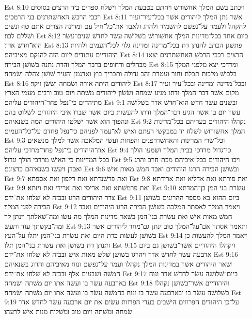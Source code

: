 Est 8:10  ויכתב בשׁם המלך אחשׁורשׁ ויחתם בטבעת המלך וישׁלח ספרים ביד הרצים בסוסים רכבי הרכשׁ האחשׁתרנים בני הרמכים׃
Est 8:11  אשׁר נתן המלך ליהודים אשׁר בכל־עיר־ועיר להקהל ולעמד על־נפשׁם להשׁמיד ולהרג ולאבד את־כל־חיל עם ומדינה הצרים אתם טף ונשׁים ושׁללם לבוז׃
Est 8:12  ביום אחד בכל־מדינות המלך אחשׁורושׁ בשׁלושׁה עשׂר לחדשׁ שׁנים־עשׂר הוא־חדשׁ אדר׃
Est 8:13  פתשׁגן הכתב להנתן דת בכל־מדינה ומדינה גלוי לכל־העמים ולהיות היהודיים עתודים ליום הזה להנקם מאיביהם׃
Est 8:14  הרצים רכבי הרכשׁ האחשׁתרנים יצאו מבהלים ודחופים בדבר המלך והדת נתנה בשׁושׁן הבירה׃
Est 8:15  ומרדכי יצא מלפני המלך בלבושׁ מלכות תכלת וחור ועטרת זהב גדולה ותכריך בוץ וארגמן והעיר שׁושׁן צהלה ושׂמחה׃
Est 8:16  ליהודים היתה אורה ושׂמחה ושׂשׂן ויקר׃
Est 8:17  ובכל־מדינה ומדינה ובכל־עיר ועיר מקום אשׁר דבר־המלך ודתו מגיע שׂמחה ושׂשׂון ליהודים משׁתה ויום טוב ורבים מעמי הארץ מתיהדים כי־נפל פחד־היהודים עליהם׃
Est 9:1  ובשׁנים עשׂר חדשׁ הוא־חדשׁ אדר בשׁלושׁה עשׂר יום בו אשׁר הגיע דבר־המלך ודתו להעשׂות ביום אשׁר שׂברו איבי היהודים לשׁלוט בהם ונהפוך הוא אשׁר ישׁלטו היהודים המה בשׂנאיהם׃
Est 9:2  נקהלו היהודים בעריהם בכל־מדינות המלך אחשׁורושׁ לשׁלח יד במבקשׁי רעתם ואישׁ לא־עמד לפניהם כי־נפל פחדם על־כל־העמים׃
Est 9:3  וכל־שׂרי המדינות והאחשׁדרפנים והפחות ועשׂי המלאכה אשׁר למלך מנשׂאים את־היהודים כי־נפל פחד־מרדכי עליהם׃
Est 9:4  כי־גדול מרדכי בבית המלך ושׁמעו הולך בכל־המדינות כי־האישׁ מרדכי הולך וגדול׃
Est 9:5  ויכו היהודים בכל־איביהם מכת־חרב והרג ואבדן ויעשׂו בשׂנאיהם כרצונם׃
Est 9:6  ובשׁושׁן הבירה הרגו היהודים ואבד חמשׁ מאות אישׁ׃
Est 9:7  ואת פרשׁנדתא ואת דלפון ואת אספתא׃
Est 9:8  ואת פורתא ואת אדליא ואת ארידתא׃
Est 9:9  ואת פרמשׁתא ואת אריסי ואת ארידי ואת ויזתא׃
Est 9:10  עשׂרת בני המן בן־המדתא צרר היהודים הרגו ובבזה לא שׁלחו את־ידם׃
Est 9:11  ביום ההוא בא מספר ההרוגים בשׁושׁן הבירה לפני המלך׃
Est 9:12  ויאמר המלך לאסתר המלכה בשׁושׁן הבירה הרגו היהודים ואבד חמשׁ מאות אישׁ ואת עשׂרת בני־המן בשׁאר מדינות המלך מה עשׂו ומה־שׁאלתך וינתן לך ומה־בקשׁתך עוד ותעשׂ׃
Est 9:13  ותאמר אסתר אם־על־המלך טוב ינתן גם־מחר ליהודים אשׁר בשׁושׁן לעשׂות כדת היום ואת עשׂרת בני־המן יתלו על־העץ׃
Est 9:14  ויאמר המלך להעשׂות כן ותנתן דת בשׁושׁן ואת עשׂרת בני־המן תלו׃
Est 9:15  ויקהלו היהודיים אשׁר־בשׁושׁן גם ביום ארבעה עשׂר לחדשׁ אדר ויהרגו בשׁושׁן שׁלשׁ מאות אישׁ ובבזה לא שׁלחו את־ידם׃
Est 9:16  ושׁאר היהודים אשׁר במדינות המלך נקהלו ועמד על־נפשׁם ונוח מאיביהם והרוג בשׂנאיהם חמשׁה ושׁבעים אלף ובבזה לא שׁלחו את־ידם׃
Est 9:17  ביום־שׁלושׁה עשׂר לחדשׁ אדר ונוח בארבעה עשׂר בו ועשׂה אתו יום משׁתה ושׂמחה׃
Est 9:18  והיהודיים אשׁר־בשׁושׁן נקהלו בשׁלושׁה עשׂר בו ובארבעה עשׂר בו ונוח בחמשׁה עשׂר בו ועשׂה אתו יום משׁתה ושׂמחה׃
Est 9:19  על־כן היהודים הפרוזים הישׁבים בערי הפרזות עשׂים את יום ארבעה עשׂר לחדשׁ אדר שׂמחה ומשׁתה ויום טוב ומשׁלוח מנות אישׁ לרעהו׃
